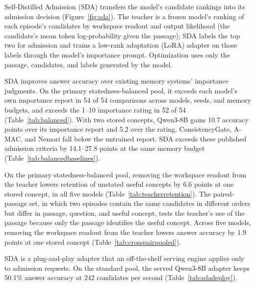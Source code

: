 Self-Distilled Admission (SDA) transfers the model's candidate rankings
into its admission decision (Figure~\ref{fig:sda}). The teacher is a
frozen model's ranking of each episode's candidates by workspace
readout and output likelihood (the candidate's mean token
log-probability given the passage); SDA labels the top two for
admission and trains a low-rank adaptation (LoRA) adapter
\citep{hu2021lora} on those labels through the model's importance
prompt. Optimization uses only the passage, candidates, and labels
generated by the model.

SDA improves answer accuracy over existing memory systems' importance
judgments. On the primary statedness-balanced pool, it exceeds each
model's own importance report in 54 of 54 comparisons across models,
seeds, and memory budgets, and exceeds the 1--10 importance rating in
52 of 54 (Table~\ref{tab:balanced}). With two stored concepts, Qwen3-8B
gains 10.7 accuracy points over its importance report and 5.2 over the
rating. ConsistencyGate, A-MAC, and Nemori fall below the untrained
report. SDA exceeds these published admission criteria by 14.1--27.8
points at the same memory budget
(Table~\ref{tab:balancedbaselines}).

On the primary statedness-balanced pool, removing the workspace
readout from the teacher lowers retention of unstated useful concepts
by 6.6 points at one stored concept, in all five models
(Table~\ref{tab:teacherretention}). The paired-passage set, in which
two episodes contain the same candidates in different orders but
differ in passage, question, and useful concept, tests the teacher's
use of the passage because only the passage identifies the useful
concept. Across five models, removing the workspace readout from the
teacher lowers answer accuracy by 1.9 points at one stored concept
(Table~\ref{tab:crosspairpooled}).

SDA is a plug-and-play adapter that an off-the-shelf serving engine
applies only to admission requests. On the standard pool, the served
Qwen3-8B adapter keeps 50.1\% answer accuracy at 242 candidates per
second (Table~\ref{tab:sdadeploy}).

